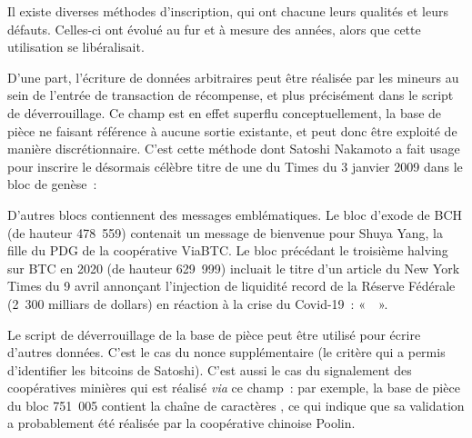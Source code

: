 Il existe diverses méthodes d'inscription, qui ont chacune leurs qualités et leurs défauts. Celles-ci ont évolué au fur et à mesure des années, alors que cette utilisation se libéralisait.

D'une part, l'écriture de données arbitraires peut être réalisée par les mineurs au sein de l'entrée de transaction de récompense, et plus précisément dans le script de déverrouillage. Ce champ est en effet superflu conceptuellement, la base de pièce ne faisant référence à aucune sortie existante, et peut donc être exploité de manière discrétionnaire. C'est cette méthode dont Satoshi Nakamoto a fait usage pour inscrire le désormais célèbre titre de une du Times du 3 janvier 2009 dans le bloc de genèse~:

\begin{quote}
\end{quote}

D'autres blocs contiennent des messages emblématiques. Le bloc d'exode de BCH (de hauteur 478~559) contenait un message de bienvenue pour Shuya Yang, la fille du PDG de la coopérative ViaBTC. Le bloc précédant le troisième halving sur BTC en 2020 (de hauteur 629~999) incluait le titre d'un article du New York Times du 9 avril annonçant l'injection de liquidité record de la Réserve Fédérale (2~300 milliars de dollars) en réaction à la crise du Covid-19~: «~~».

Le script de déverrouillage de la base de pièce peut être utilisé pour écrire d'autres données. C'est le cas du nonce supplémentaire (le critère qui a permis d'identifier les bitcoins de Satoshi). C'est aussi le cas du signalement des coopératives minières qui est réalisé \emph{via} ce champ~: par exemple, la base de pièce du bloc 751~005 contient la chaîne de caractères , ce qui indique que sa validation a probablement été réalisée par la coopérative chinoise Poolin.

